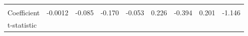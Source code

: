 \documentclass[
]{book}
\begin{document}
\begin{longtable}[]{@{}lllllllll@{}}
\begin{minipage}[t]{0.09\columnwidth}
\strut
\end{minipage} & \begin{minipage}[t]{0.07\columnwidth}\raggedright
\strut
\end{minipage} & \begin{minipage}[t]{0.06\columnwidth}\raggedright
\strut
\end{minipage} & \begin{minipage}[t]{0.11\columnwidth}\raggedright
\strut
\end{minipage} & \begin{minipage}[t]{0.07\columnwidth}\raggedright
\strut
\end{minipage} & \begin{minipage}[t]{0.07\columnwidth}\raggedright
\strut
\end{minipage} & \begin{minipage}[t]{0.10\columnwidth}\raggedright
\strut
\end{minipage}\tabularnewline
\begin{minipage}[t]{0.10\columnwidth}\raggedright
Coefficient\strut
\end{minipage} & \begin{minipage}[t]{0.08\columnwidth}\raggedright
-0.0012\strut
\end{minipage} & \begin{minipage}[t]{0.09\columnwidth}\raggedright
-0.085\strut
\end{minipage} & \begin{minipage}[t]{0.07\columnwidth}\raggedright
-0.170\strut
\end{minipage} & \begin{minipage}[t]{0.06\columnwidth}\raggedright
-0.053\strut
\end{minipage} & \begin{minipage}[t]{0.11\columnwidth}\raggedright
0.226\strut
\end{minipage} & \begin{minipage}[t]{0.07\columnwidth}\raggedright
-0.394\strut
\end{minipage} & \begin{minipage}[t]{0.07\columnwidth}\raggedright
0.201\strut
\end{minipage} & \begin{minipage}[t]{0.10\columnwidth}\raggedright
-1.146\strut
\end{minipage}\tabularnewline
\begin{minipage}[t]{0.10\columnwidth}\raggedright
t-statistic\strut
\end{minipage} & \begin{minipage}[t]{0.08\columnwidth}\raggedright

\end{minipage}
\end{longtable}
\end{document}
